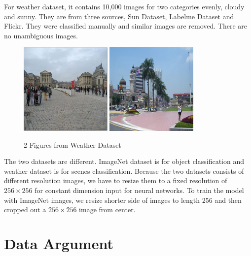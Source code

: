 For weather dataset, it contains 10,000 images for two categories evenly, cloudy and sunny. They are from three sources, Sun Dataset\citep{russell2008labelme}, Labelme Dataset\citep{xiao2010sun} and Flickr. They were classified manually and similar images are removed. There are no unambiguous images.
\graphicspath{ {./Figures/} }
\begin{figure}[!htb]
    \centering
	\includegraphics[width=0.4\textwidth]{cloudy_0001.png}
    \qquad
    \includegraphics[width=0.4\textwidth]{sunny_0003.png}
    \caption{2 Figures from Weather Dataset}%
    \label{fig:WeatherExamples}%
\end{figure}

The two datasets are different. ImageNet dataset is for object classification and weather dataset is for scenes classification. Because the two datasets consists of different resolution images, we have to resize them to a fixed resolution of $256\times256$ for constant dimension input for neural networks. To train the model with ImageNet images, we resize shorter side of images to length 256 and then cropped out a $256\times256$ image from center.

\section{Data Argument}

